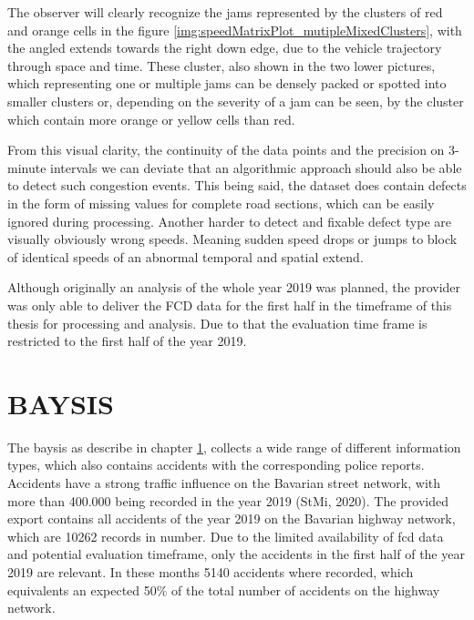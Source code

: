 \documentclass[a4paper,12pt]{report}
\begin{document}
\par The observer will clearly recognize the jams represented by the clusters of red and orange cells in the figure \ref{img:speedMatrixPlot_mutipleMixedClusters}, with the angled extends towards the right down edge, due to the vehicle trajectory through space and time. These cluster, also shown in the two lower pictures, which representing one or multiple jams can be densely packed or spotted into smaller clusters or, depending on the severity of a jam can be seen, by the cluster which contain more orange or yellow cells than red. 
\par From this visual clarity, the continuity of the data points and the precision on 3-minute intervals we can deviate that an algorithmic approach should also be able to detect such congestion events. This being said, the dataset does contain defects in the form of missing values for complete road sections, which can be easily ignored during processing. Another harder to detect and fixable defect type are visually obviously wrong speeds. Meaning sudden speed drops or jumps to block of identical speeds of an abnormal temporal and spatial extend. 
\par Although originally an analysis of the whole year 2019 was planned, the provider was only able to deliver the FCD data for the first half in the timeframe of this thesis for processing and analysis. Due to that the evaluation time frame is restricted to the first half of the year 2019.

\section{BAYSIS}
\label{dataset_baysis}
\par The \acrfull{baysis} as describe in chapter \ref{dataset_baysis}, collects a wide range of different information types, which also contains accidents with the corresponding police reports. Accidents have a strong traffic influence on the Bavarian street network, with more than 400.000 being recorded in the year 2019 (StMi, 2020). The provided export contains all accidents of the year 2019 on the Bavarian highway network, which are 10262 records in number. Due to the limited availability of \acrshort{fcd} data and potential evaluation timeframe, only the accidents in the first half of the year 2019 are relevant. In these months 5140 accidents where recorded, which equivalents an expected 50\% of the total number of accidents on the highway network. \newline
\end{document}

